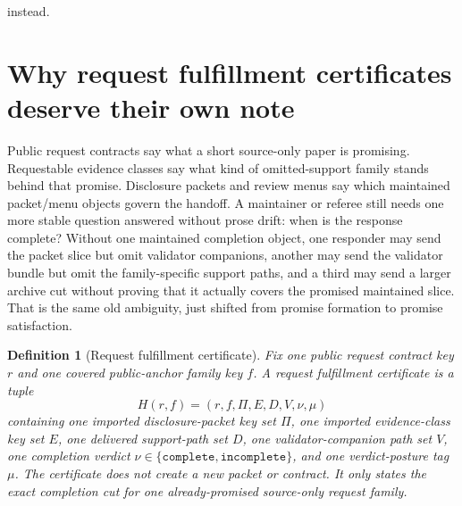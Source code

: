 \documentclass[11pt]{article}
\newtheorem{definition}{Definition}
\begin{document}
instead.\cite{series:publicrequestcontracts,series:requestableevidenceclasses,series:publicrequeststatusenvelopes,series:publicrequestcarryforward,series:publicrequestnotices,series:publicrequestnoticenormalforms,series:publicrequestnoticeselections,series:publicrequestresponsemenus,series:publicrequestresponsepackets,series:publicrequestresponsepacketcarryforward,series:publicrequestresponsepacketdeltas,series:publicrequestrefreshnotices,series:publicrequestrefreshnormalforms,series:publicrequestrefreshselections,series:publicrequestsuccessormenus,series:publicrequestsuccessorpackets,series:requestsideterminalcitationnormalform,series:pairedterminalcitationdiscipline,series:pairedterminalcutoverrules,series:workedexample}

\section{Why request fulfillment certificates deserve their own note}
Public request contracts say what a short source-only paper is promising.
Requestable evidence classes say what kind of omitted-support family stands behind that promise.
Disclosure packets and review menus say which maintained packet/menu objects govern the handoff.
A maintainer or referee still needs one more stable question answered without prose drift: when is the response complete?
Without one maintained completion object, one responder may send the packet slice but omit validator companions, another may send the validator bundle but omit the family-specific support paths, and a third may send a larger archive cut without proving that it actually covers the promised maintained slice.
That is the same old ambiguity, just shifted from promise formation to promise satisfaction.

\begin{definition}[Request fulfillment certificate]
Fix one public request contract key $r$ and one covered public-anchor family key $f$.
A \emph{request fulfillment certificate} is a tuple
\[
H(r,f)=(r,f,\Pi,E,D,V,\nu,\mu)
\]
containing one imported disclosure-packet key set $\Pi$, one imported evidence-class key set $E$, one delivered support-path set $D$, one validator-companion path set $V$, one completion verdict $\nu\in\{\texttt{complete},\texttt{incomplete}\}$, and one verdict-posture tag $\mu$.
The certificate does not create a new packet or contract.
It only states the exact completion cut for one already-promised source-only request family.
\end{definition}
\end{document}
